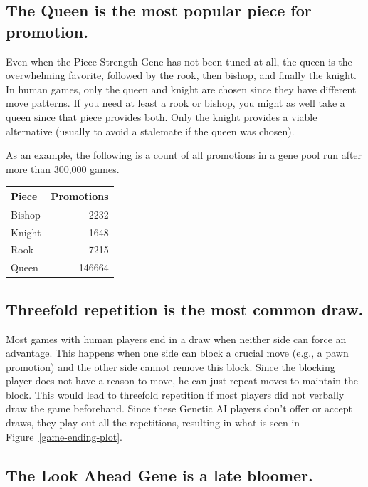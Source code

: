 \documentclass[letterpaper]{article}
\renewcommand{\_}{\allowbreak\textunderscore\allowbreak}
\begin{document}
\subsection{The Queen is the most popular piece for promotion.}

Even when the Piece Strength Gene has not been tuned at all, the queen is the overwhelming favorite, followed by the rook, then bishop, and finally the knight. In human games, only the queen and knight are chosen since they have different move patterns. If you need at least a rook or bishop, you might as well take a queen since that piece provides both. Only the knight provides a viable alternative (usually to avoid a stalemate if the queen was chosen).

As an example, the following is a count of all promotions in a gene pool run after more than 300,000 games.
\begin{center}
\begin{tabular}{l r}
	Piece & Promotions \\
\toprule
	Bishop & 2232  \\
	Knight  &  1648 \\
	Rook    &  7215 \\
	Queen  & 146664 \\
\end{tabular}
\end{center}


\subsection{Threefold repetition is the most common draw.}

Most games with human players end in a draw when neither side can force an advantage. This happens when one side can block a crucial move (e.g., a pawn promotion) and the other side cannot remove this block. Since the blocking player does not have a reason to move, he can just repeat moves to maintain the block. This would lead to threefold repetition if most players did not verbally draw the game beforehand. Since these Genetic AI players don't offer or accept draws, they play out all the repetitions, resulting in what is seen in Figure~\ref{game-ending-plot}.

\subsection{The Look Ahead Gene is a late bloomer.}
\end{document}
